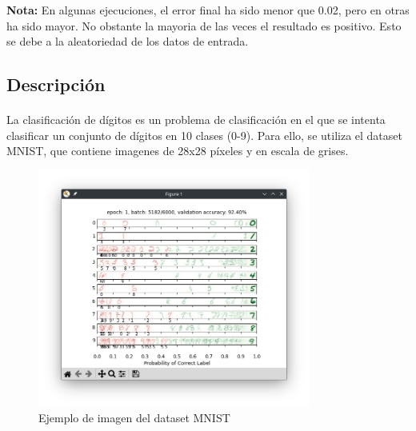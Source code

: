 \documentclass{report}
\begin{document}
{          \textbf{Nota:} En algunas ejecuciones, el error final ha sido menor que 0.02, pero en otras ha sido mayor. No obstante la mayoria de las veces el resultado es positivo. Esto se debe a la aleatoriedad de los datos de entrada.
        }
      \subsection*{Descripción}
        \paragraph*{}
        {
          La clasificación de dígitos es un problema de clasificación en el que se intenta clasificar un conjunto de dígitos en 10 clases (0-9).
          Para ello, se utiliza el dataset MNIST, que contiene imagenes de 28x28 píxeles y en escala de grises.
          
          \begin{figure}[H]
            \centering
            \includegraphics[width=0.8\textwidth]{.img/mnist.png}
            \caption{Ejemplo de imagen del dataset MNIST}
          \end{figure}
        }
\end{document}
